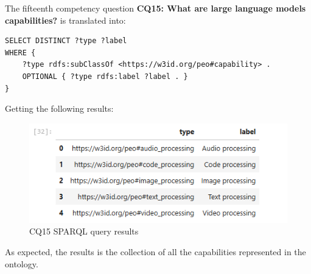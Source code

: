 The fifteenth competency question \textbf{CQ15: What are large language models capabilities?} is translated into:
\begin{lstlisting}
SELECT DISTINCT ?type ?label
WHERE {
    ?type rdfs:subClassOf <https://w3id.org/peo#capability> .
    OPTIONAL { ?type rdfs:label ?label . }
}
\end{lstlisting}
Getting the following results:
\begin{figure}[H]
    \centering
    \includegraphics[width=0.8\linewidth]{Figures/fig_61.png}
    \caption{CQ15 SPARQL query results}
    \label{fig:enter-label}
\end{figure}
As expected, the results is the collection of all the capabilities represented in the ontology.\\

